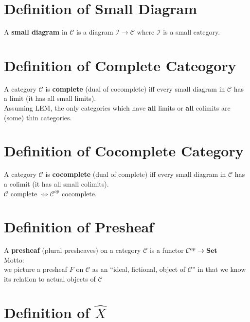 \documentclass[a4paper, twoside, english, 11pt]{book}
\newcommand{\C}{\mathcal C}
\newcommand{\I}{\mathcal I}
\newcommand{\catname}[1]{{\normalfont\textbf{#1}}}
\newcommand{\Set}{\catname{Set}}
\begin{document}
\section{Definition of Small Diagram}

A \textbf{small diagram} in $\C$ is a diagram $\I \rightarrow \C$ where $\I$ is a small category.



\section{Definition of Complete Cateogory}

A category $\C$ is \textbf{complete} (dual of cocomplete) iff every small diagram in $\C$ has a limit (it has all small limits). \\

\noindent
Assuming LEM, the only categories which have \textbf{all} limits or \textbf{all} colimits are (some) thin categories.



\section{Definition of Cocomplete Category}

A category $\C$ is \textbf{cocomplete} (dual of complete) iff every small diagram in $\C$ has a colimit (it has all small colimits). \\

\noindent
$\C$ complete $\iff \C^{op}$ cocomplete.



\section{Definition of Presheaf}

A \textbf{presheaf} (plural presheaves) on a category $\C$ is a functor $\C^{op} \rightarrow \Set$ \\

\noindent
Motto: \\
we picture a presheaf $F$ on $\C$ as an ``ideal, fictional, object of $\C$'' in that we know its relation to actual objects of $\C$



\section {Definition of $\hat X$}
\end{document}
